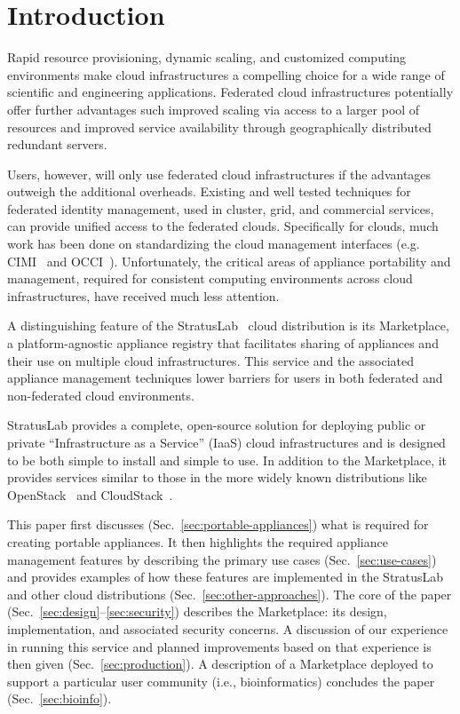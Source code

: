 \section{Introduction}
\label{sec:Introduction}

Rapid resource provisioning, dynamic scaling, and customized computing
environments make cloud infrastructures a compelling choice for a wide
range of scientific and engineering applications.  Federated cloud
infrastructures potentially offer further advantages such improved
scaling via access to a larger pool of resources and improved service
availability through geographically distributed redundant servers.

Users, however, will only use federated cloud infrastructures if the
advantages outweigh the additional overheads.  Existing and well
tested techniques for federated identity management, used in cluster,
grid, and commercial services, can provide unified access to the
federated clouds.  Specifically for clouds, much work has been done on
standardizing the cloud management interfaces (e.g. CIMI~\cite{cimi}
and OCCI~\cite{occi}).  Unfortunately, the critical areas of appliance
portability and management, required for consistent computing
environments across cloud infrastructures, have received much less
attention.

A distinguishing feature of the StratusLab~\cite{slbook} cloud
distribution is its Marketplace, a platform-agnostic appliance
registry that facilitates sharing of appliances and their use on
multiple cloud infrastructures.  This service and the associated
appliance management techniques lower barriers for users in both
federated and non-federated cloud environments.

StratusLab provides a complete, open-source solution for deploying
public or private ``Infrastructure as a Service'' (IaaS) cloud
infrastructures and is designed to be both simple to install and
simple to use.  In addition to the Marketplace, it provides services
similar to those in the more widely known distributions like
OpenStack~\cite{openstack} and CloudStack~\cite{cloudstack}.

This paper first discusses (Sec.~\ref{sec:portable-appliances}) what
is required for creating portable appliances. It then highlights the
required appliance management features by describing the primary use
cases (Sec.~\ref{sec:use-cases}) and provides examples of how these
features are implemented in the StratusLab and other cloud
distributions (Sec.~\ref{sec:other-approaches}).  The core of the
paper (Sec.~\ref{sec:design}--\ref{sec:security}) describes the
Marketplace: its design, implementation, and associated security
concerns.  A discussion of our experience in running this service and
planned improvements based on that experience is then given
(Sec.~\ref{sec:production}). A description of a Marketplace deployed
to support a particular user community (i.e., bioinformatics)
concludes the paper (Sec.~\ref{sec:bioinfo}).
